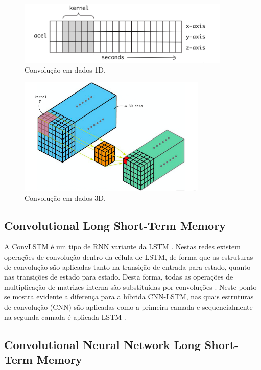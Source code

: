 \begin{figure}[h]
  \centering
  \caption{Convolução em dados 1D.}
   \label{fig:cnn_convolution}
   \includegraphics[width=0.9\textwidth]{figuras/fig_11.png}
\end{figure}

\begin{figure}[h]
  \centering
  \caption{Convolução em dados 3D.}
   \label{fig:cnn_convolution_3d}
   \includegraphics[width=0.8\textwidth]{figuras/fig_12.png}
\end{figure}

\subsection{Convolutional Long Short-Term Memory}

A ConvLSTM é um tipo de RNN variante da LSTM \cite{Salman2018}. Nestas redes existem operações de convolução dentro da célula de LSTM, de forma que as estruturas de convolução são aplicadas tanto na transição de entrada para estado, quanto nas transições de estado para estado. Desta forma, todas as operações de multiplicação de matrizes interna são substituídas por convoluções \cite{Rahman2019}. Neste ponto se mostra evidente a diferença para a híbrida CNN-LSTM, nas quais estruturas de convolução (CNN) são aplicadas como a primeira camada e sequencialmente na segunda camada é aplicada LSTM \cite{Rahman2019}.

\subsection{Convolutional Neural Network Long Short-Term Memory}

